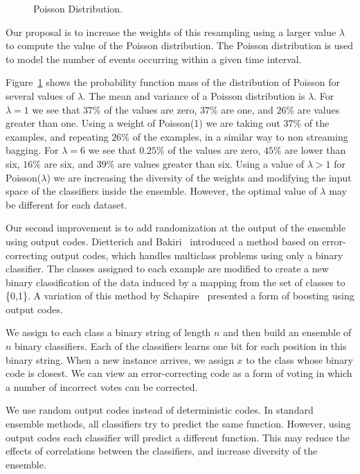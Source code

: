   
  \begin{figure}[h]
\begin{center} 

\end{center}
\caption{Poisson Distribution.}

\label{fig:poisson}
\end{figure}
 Our proposal is to increase the weights of this resampling using a larger value $\lambda$ to compute the value of the Poisson distribution.  
The Poisson distribution is used to model the number of events occurring within a given time interval. 

Figure~\ref{fig:poisson} shows the probability function mass of the distribution of Poisson for several values of $\lambda$. The mean and variance of a Poisson distribution is $\lambda$.  
For $\lambda=1$ we see that $37\%$ of the values are zero, $37\%$ are one, and $26\%$ are values greater than one. Using a weight of Poisson(1) we are taking out   $37\%$ of the examples, and repeating $26\%$ of the examples, in a similar way to non streaming bagging.
For $\lambda=6$ we see that $0.25\%$ of the values are zero, $45\%$ are lower than six, $16\%$ are six, and $39\%$ are values greater than six.  Using a  value of $\lambda > 1$ for Poisson($\lambda$) we are increasing the diversity of the weights and modifying the input space of the classifiers inside the ensemble. However, the optimal value of $\lambda$ may be different for each dataset. 
  
 Our second improvement is to add randomization at the output of the ensemble using output codes. Dietterich and Bakiri~\cite{ecoc} introduced a method based on error-correcting output codes, which handles multiclass problems using only a binary classifier. The classes assigned to each example are modified to create a new binary classification of the data induced by a mapping from the set of classes to \{0,1\}. A variation of this method by Schapire~\cite{BoostOC} presented a form of boosting using output codes.
 
 We assign to each class a binary string of length $n$ and then build an ensemble of $n$ binary classifiers. Each of the classifiers learns one bit for each position in this binary string. When a new instance arrives, we assign $x$ to the class whose binary code is closest. We can view an error-correcting code as a form of voting in which a number of incorrect votes can be corrected.
 
We use random output codes instead of deterministic codes. In standard ensemble methods, all classifiers try to predict the same function. However, using output codes each classifier will predict a different function. This may reduce the effects of correlations between the classifiers, and increase diversity of the ensemble.

